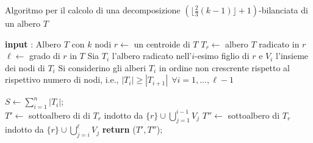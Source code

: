 \begin{algorithm}[H]
	\label{algoritmo1}
	\SetAlgoLined
	\caption{Algoritmo per il calcolo di una decomposizione $ (\lfloor \frac{2}{3}(k-1) \rfloor + 1)$-bilanciata di un albero $T$ }
	\textbf{input} : Albero $ T $ con $ k $ nodi\;
	$r \gets $ un centroide di $T$\;
	$T_r \gets $ albero $T$ radicato in $r$\;
	$\ell \gets$ grado di $r$ in $T$\; 
	Sia $T_i$ l'albero radicato nell'$ i $-esimo figlio di $ r $ e $V_i$ l'insieme dei nodi di $T_i$ \;
	Si considerino gli alberi $T_i$ in ordine non crescrente rispetto al rispettivo numero di nodi, i.e., $ |T_{i}|\ge |T_{i+1}| \ \ \forall {i = 1,\dots, \ell-1} $\;
	
	$ S \gets \sum_{i=1}^{n}|T_i| $;\\
	{
		{
			$ T'\gets $ sottoalbero di  di $ T_r $ indotto da $ \{r\} \cup \bigcup_{j=1}^{i-1} V_j$\; 
			$ T'' \gets $ sottoalbero di $ T_r $ indotto da $ \{r\} \cup \bigcup_{j=i}^\ell V_j $\;
			\textbf{return} ($ T',T'' $);\;
		}	 
}
\end{algorithm}



